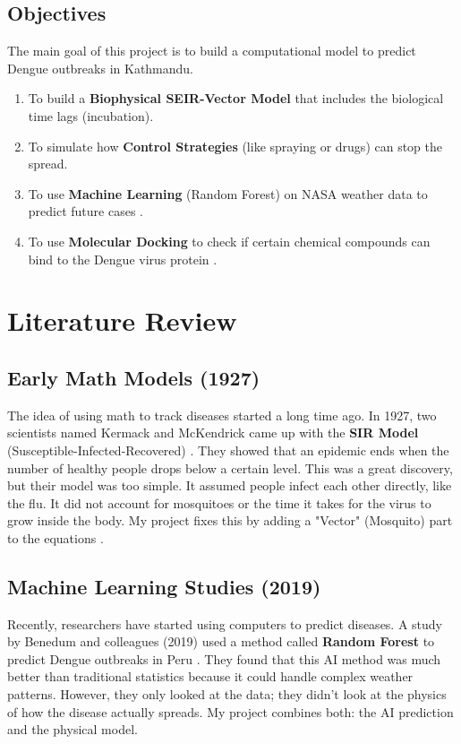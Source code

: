 \documentclass[12pt, a4paper]{article}
\begin{document}
\subsection{Objectives}
The main goal of this project is to build a computational model to predict Dengue outbreaks in Kathmandu.
\begin{enumerate}
    \item To build a \textbf{Biophysical SEIR-Vector Model} that includes the biological time lags (incubation).
    \item To simulate how \textbf{Control Strategies} (like spraying or drugs) can stop the spread.
    \item To use \textbf{Machine Learning} (Random Forest) on NASA weather data to predict future cases \cite{ref5}.
    \item To use \textbf{Molecular Docking} to check if certain chemical compounds can bind to the Dengue virus protein \cite{ref6}.
\end{enumerate}

\newpage

\section{Literature Review}

\subsection{Early Math Models (1927)}
The idea of using math to track diseases started a long time ago. In 1927, two scientists named Kermack and McKendrick came up with the \textbf{SIR Model} (Susceptible-Infected-Recovered) \cite{ref2}. They showed that an epidemic ends when the number of healthy people drops below a certain level. This was a great discovery, but their model was too simple. It assumed people infect each other directly, like the flu. It did not account for mosquitoes or the time it takes for the virus to grow inside the body. My project fixes this by adding a "Vector" (Mosquito) part to the equations \cite{ref10}.

\subsection{Machine Learning Studies (2019)}
Recently, researchers have started using computers to predict diseases. A study by Benedum and colleagues (2019) used a method called \textbf{Random Forest} to predict Dengue outbreaks in Peru \cite{ref5}. They found that this AI method was much better than traditional statistics because it could handle complex weather patterns. However, they only looked at the data; they didn't look at the physics of how the disease actually spreads. My project combines both: the AI prediction and the physical model.
\end{document}
